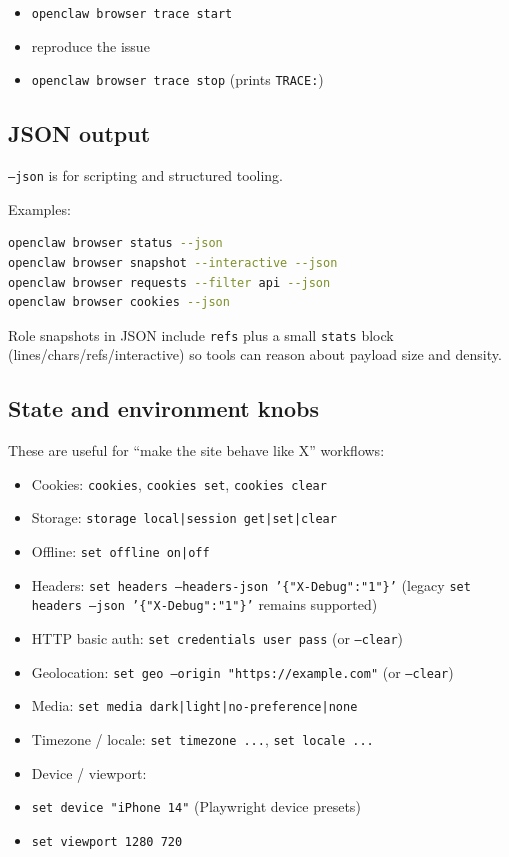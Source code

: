 \begin{itemize}
  \item \texttt{openclaw browser trace start}
  \item reproduce the issue
  \item \texttt{openclaw browser trace stop} (prints \texttt{TRACE:})
\end{itemize}


\subsection{JSON output}


\texttt{--json} is for scripting and structured tooling.

Examples:

\begin{lstlisting}[language=bash]
openclaw browser status --json
openclaw browser snapshot --interactive --json
openclaw browser requests --filter api --json
openclaw browser cookies --json
\end{lstlisting}


Role snapshots in JSON include \texttt{refs} plus a small \texttt{stats} block (lines/chars/refs/interactive) so tools can reason about payload size and density.

\subsection{State and environment knobs}


These are useful for “make the site behave like X” workflows:

\begin{itemize}
  \item Cookies: \texttt{cookies}, \texttt{cookies set}, \texttt{cookies clear}
  \item Storage: \texttt{storage local|session get|set|clear}
  \item Offline: \texttt{set offline on|off}
  \item Headers: \texttt{set headers --headers-json '\{"X-Debug":"1"\}'} (legacy \texttt{set headers --json '\{"X-Debug":"1"\}'} remains supported)
  \item HTTP basic auth: \texttt{set credentials user pass} (or \texttt{--clear})
  \item Geolocation: \texttt{set geo   --origin "https://example.com"} (or \texttt{--clear})
  \item Media: \texttt{set media dark|light|no-preference|none}
  \item Timezone / locale: \texttt{set timezone ...}, \texttt{set locale ...}
  \item Device / viewport:
  \item \texttt{set device "iPhone 14"} (Playwright device presets)
  \item \texttt{set viewport 1280 720}
\end{itemize}


